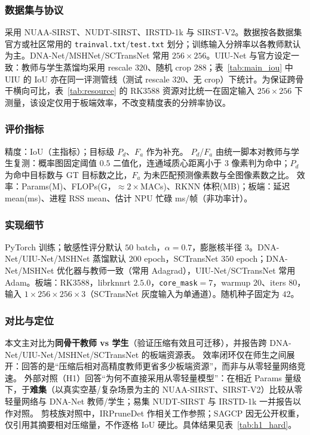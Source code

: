 \documentclass[lettersize,journal]{IEEEtran}
\begin{document}
\subsubsection{数据集与协议}
采用 NUAA-SIRST、NUDT-SIRST、IRSTD-1k 与 SIRST-V2。数据按各数据集官方或社区常用的 \texttt{trainval.txt}/\texttt{test.txt} 划分；训练输入分辨率以各教师默认为主。DNA-Net/MSHNet/SCTransNet 常用 $256\times256$。UIU-Net 与官方设定一致：教师与学生蒸馏均采用 rescale $320$、随机 crop $288$；表~\ref{tab:main_iou} 中 UIU 的 IoU 亦在同一评测管线（测试 rescale $320$、无 crop）下统计。为保证跨骨干横向可比，表~\ref{tab:resource} 的 RK3588 资源对比统一在固定输入 $256\times256$ 下测量，该设定仅用于板端效率，不改变精度表的分辨率协议。

\subsubsection{评价指标}
精度：IoU（主指标）；目标级 $P_d$、$F_a$ 作为补充。
$P_d$/$F_a$ 由统一脚本对教师与学生复测：概率图固定阈值 $0.5$ 二值化，连通域质心距离小于 $3$ 像素判为命中；$P_d$ 为命中目标数与 GT 目标数之比，$F_a$ 为未匹配预测像素数与全图像素数之比。
效率：Params(M)、FLOPs(G，$\approx 2\times$MACs)、RKNN 体积(MB)；板端：延迟 mean(ms)、进程 RSS mean、估计 NPU 忙碌 ms/帧（非功率计）。

\subsubsection{实现细节}
PyTorch 训练；敏感性评分默认 $50$ batch，$\alpha=0.7$，膨胀核半径 $3$。DNA-Net/UIU-Net/MSHNet 蒸馏默认 $200$ epoch，SCTransNet $350$ epoch；DNA-Net/MSHNet 优化器与教师一致（常用 Adagrad），UIU-Net/SCTransNet 常用 Adam。板端：RK3588，librknnrt $2.5.0$，\texttt{core\_mask}$=7$，warmup $20$、iters $80$，输入 $1\times256\times256\times3$（SCTransNet 灰度输入为单通道）。随机种子固定为 $42$。

\subsubsection{对比与定位}
本文主对比为\textbf{同骨干教师 vs 学生}（验证压缩有效且可迁移），并报告跨 DNA-Net/UIU-Net/MSHNet/SCTransNet 的板端资源表。
效率闭环仅在师生之间展开：回答的是“压缩后相对高精度教师更省多少板端资源”，而非与从零轻量网络竞速。
外部对照（H1）回答“为何不直接采用从零轻量模型”：在相近 Params 量级下，于\textbf{难集}（以真实空基/复杂场景为主的 NUAA-SIRST、SIRST-V2）比较从零轻量网络与 DNA-Net 教师/学生；易集 NUDT-SIRST 与 IRSTD-1k 一并报告以作对照。
剪枝族对照中，IRPruneDet\cite{IRPruneDet2024} 作相关工作参照；SAGCP\cite{SAGCP2025} 因无公开权重，仅引用其摘要相对压缩量，不作逐格 IoU 硬比。具体结果见表~\ref{tab:h1_hard}。
\end{document}
